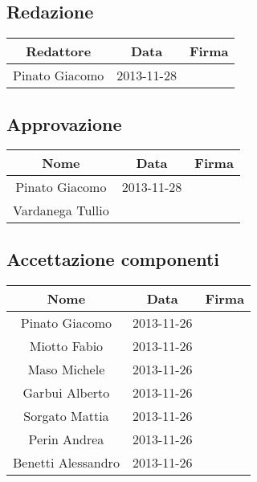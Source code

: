 \subsection{Redazione}%
\label{1.1}
\begin{center}
\begin{longtable}{|c|c|p{5cm}|}
\toprule
\textbf{Redattore} & \textbf{Data} & \textbf{Firma}\\
\midrule
Pinato Giacomo & 2013-11-28 & \\
\bottomrule
\end{longtable}
\end{center} 

\subsection{Approvazione}
\label{1.2}
\begin{center}
\begin{longtable}{|c|c|p{5cm}|}
\toprule
\textbf{Nome} & \textbf{Data} & \textbf{Firma}\\
\midrule
Pinato Giacomo & 2013-11-28 & \\
Vardanega Tullio &   & \\
\bottomrule
\end{longtable}
\end{center} 

\subsection{Accettazione componenti}
\label{1.3}
\begin{center}
\begin{longtable}{|c|c|p{5cm}|}
\toprule
\textbf{Nome} & \textbf{Data} & \textbf{Firma}\\
\midrule
Pinato Giacomo & 2013-11-26 & \\
Miotto Fabio & 2013-11-26 & \\
Maso Michele & 2013-11-26 & \\
Garbui Alberto & 2013-11-26 & \\
Sorgato Mattia & 2013-11-26 & \\
Perin Andrea & 2013-11-26 & \\
Benetti Alessandro & 2013-11-26 & \\
\bottomrule
\end{longtable}
\end{center} 

